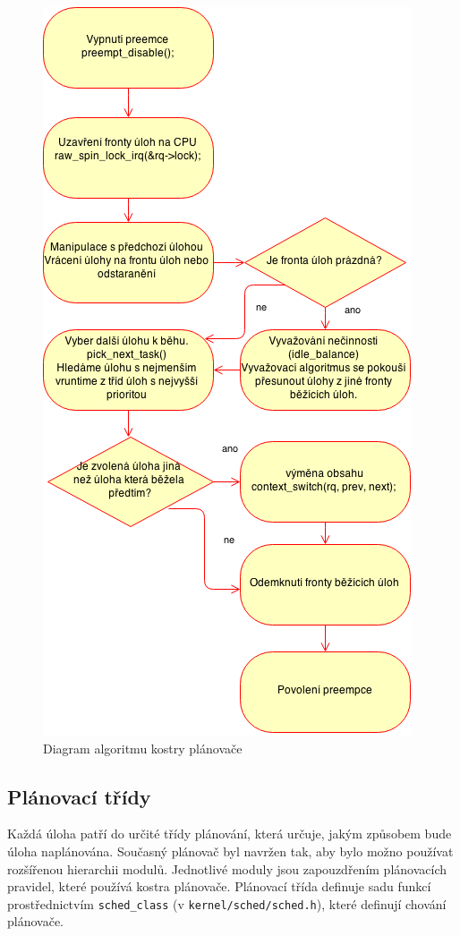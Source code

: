 \documentclass[
  field=ainfk,
  biblatex,
  glossaries,
  index
]{kidiplom}
\begin{document}
\begin{figure}[p]
\center
\includegraphics[scale=0.7]{obrazky/kostraPlanovace.png}
\caption{Diagram algoritmu kostry plánovače}
\label{kostra planovace}
\end{figure}

\subsection{Plánovací třídy}
Každá úloha patří do určité třídy plánování, která určuje, jakým způsobem bude úloha naplánována. 
Současný plánovač byl navržen tak, aby bylo možno používat rozšířenou hierarchii modulů. Jednotlivé moduly jsou zapouzdřením plánovacích pravidel, které používá kostra plánovače. 
Plánovací třída definuje sadu funkcí prostřednictvím \verb#sched_class# (v \verb#kernel/sched/sched.h#), které definují chování plánovače. 
\end{document}
